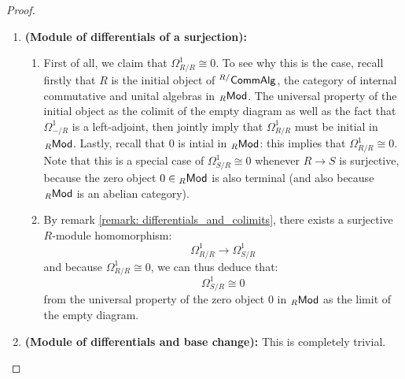                     \begin{proof}
                        \noindent
                        \begin{enumerate}
                            \item \textbf{(Module of differentials of a surjection):} 
                                \begin{enumerate}
                                    \item First of all, we claim that $\Omega^1_{R/R} \cong 0$. To see why this is the case, recall firstly that $R$ is the initial object of ${}^{R/}\mathsf{Comm}\mathsf{Alg}$, the category of internal commutative and unital algebras in ${}_R\mathsf{Mod}$. The universal property of the initial object as the colimit of the empty diagram as well as the fact that $\Omega^1_{-/R}$ is a left-adjoint, then jointly imply that $\Omega^1_{R/R}$ must be initial in ${}_R\mathsf{Mod}$. Lastly, recall that $0$ is intial in ${}_R\mathsf{Mod}$: this implies that $\Omega^1_{R/R} \cong 0$. Note that this is a special case of $\Omega^1_{S/R} \cong 0$ whenever $R \to S$ is surjective, because the zero object $0 \in {}_R\mathsf{Mod}$ is also terminal (and also because ${}_R\mathsf{Mod}$ is an abelian category).
                                    \item By remark \ref{remark: differentials_and_colimits}, there exists a surjective $R$-module homomorphism:
                                        $$\Omega^1_{R/R} \to \Omega^1_{S/R}$$
                                    and because $\Omega^1_{R/R} \cong 0$, we can thus deduce that:
                                        $$\Omega^1_{S/R} \cong 0$$
                                    from the universal property of the zero object $0$ in ${}_R\mathsf{Mod}$ as the limit of the empty diagram.
                                \end{enumerate}
                            \item \textbf{(Module of differentials and base change):} This is completely trivial.
                        \end{enumerate}
                    \end{proof}
                    
